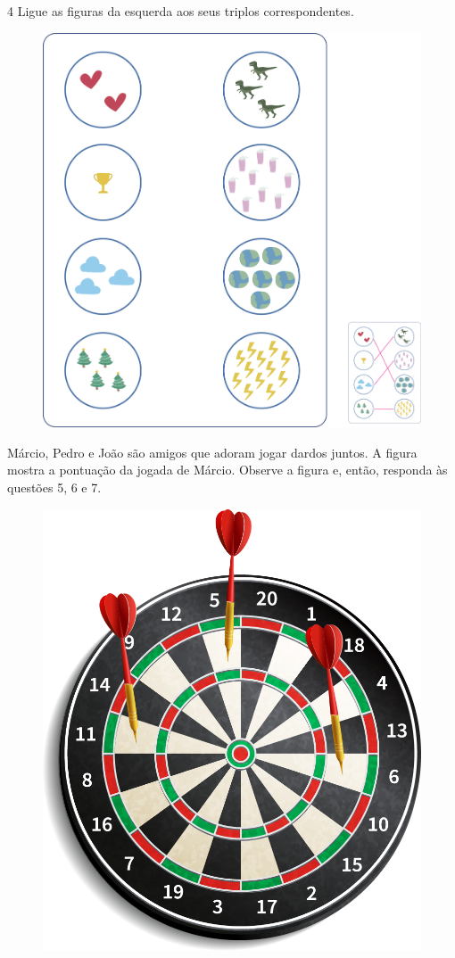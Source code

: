 \pagebreak
\num{4} Ligue as figuras da esquerda aos seus triplos correspondentes.

\begin{figure}[htpb!]
\includegraphics[width=\textwidth]{./media/image107.png}
\end{figure}

\pagebreak
Márcio, Pedro e João são amigos que adoram jogar dardos juntos. A figura mostra a pontuação da jogada de Márcio. Observe a figura e, então, responda às questões 5, 6 e 7.

\begin{figure}[htpb!]
\centering
\includegraphics[width=.5\textwidth]{./media/image108.png}
\end{figure}


